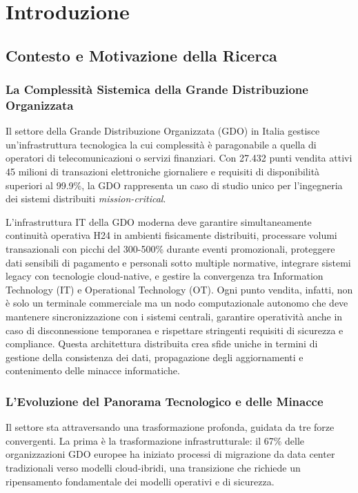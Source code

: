 
\chapter{Introduzione}

\section{Contesto e Motivazione della Ricerca}

\subsection{La Complessità Sistemica della Grande Distribuzione Organizzata}

Il settore della Grande Distribuzione Organizzata (GDO) in Italia gestisce un'infrastruttura tecnologica la cui complessità è paragonabile a quella di operatori di telecomunicazioni o servizi finanziari. Con 27.432 punti vendita attivi\autocite{istat2024} 45 milioni di transazioni elettroniche giornaliere e requisiti di disponibilità superiori al 99.9\%, la GDO rappresenta un caso di studio unico per l'ingegneria dei sistemi distribuiti\textit{ mission-critical}.

L'infrastruttura IT della GDO moderna deve garantire simultaneamente continuità operativa H24 in ambienti fisicamente distribuiti, processare volumi transazionali con picchi del 300-500\% durante eventi promozionali\autocite{Osservatorio2024}, proteggere dati sensibili di pagamento e personali sotto multiple normative, integrare sistemi legacy con tecnologie cloud-native, e gestire la convergenza tra Information Technology (IT) e Operational Technology (OT). Ogni punto vendita, infatti, non è solo un terminale commerciale ma un nodo computazionale autonomo che deve mantenere sincronizzazione con i sistemi centrali, garantire operatività anche in caso di disconnessione temporanea e rispettare stringenti requisiti di sicurezza e compliance. Questa architettura distribuita crea sfide uniche in termini di gestione della consistenza dei dati, propagazione degli aggiornamenti e contenimento delle minacce informatiche.

\subsection{L'Evoluzione del Panorama Tecnologico e delle Minacce}

Il settore sta attraversando una trasformazione profonda, guidata da tre forze convergenti. La prima è la trasformazione infrastrutturale: il 67\% delle organizzazioni GDO europee ha iniziato processi di migrazione da data center tradizionali verso modelli cloud-ibridi\autocite{gartner2024cloud}, una transizione che richiede un ripensamento fondamentale dei modelli operativi e di sicurezza.

